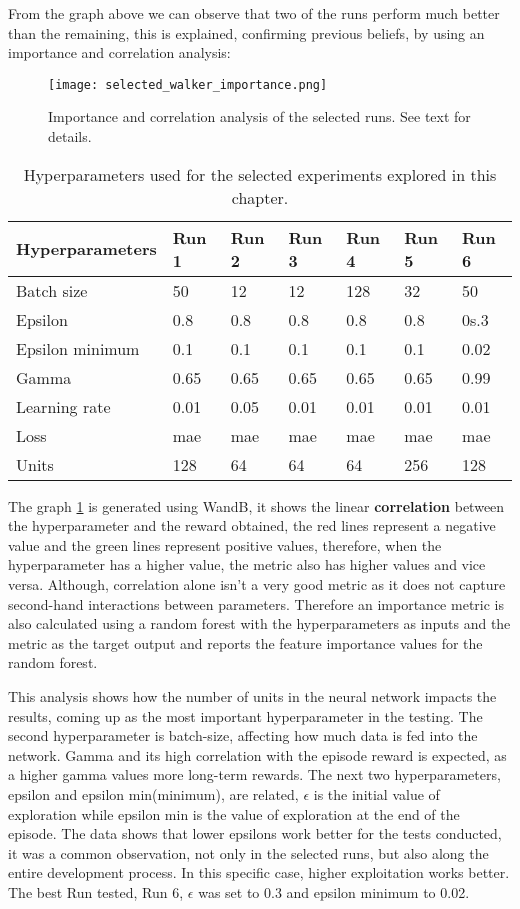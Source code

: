 From the graph above we can observe that two of the runs perform much better than the remaining, this is explained, confirming previous beliefs, by using an importance and correlation analysis:
\begin{figure}[H]
 \centering
 \texttt{[image: selected\_walker\_importance.png]}
 \caption{Importance and correlation analysis of the selected runs. See text for details.}
\label{fig:importance}
\end{figure}

\begin{table}[H]
 \centering
 \caption{Hyperparameters used for the selected experiments explored in this chapter.}
 \label{table:graph_walker}
 \begin{tabular}{|l|l|l|l|l|l|l|}
 \hline
 Hyperparameters & Run 1 & Run 2 & Run 3 & Run 4 & Run 5 & Run 6 \\ \hline
 Batch size & 50 & 12 & 12 & 128 & 32 & 50 \\ \hline
 Epsilon & 0.8 & 0.8 & 0.8 & 0.8 & 0.8 & 0s.3 \\ \hline
 Epsilon minimum & 0.1 & 0.1 & 0.1 & 0.1 & 0.1 & 0.02 \\ \hline
 Gamma & 0.65 & 0.65 & 0.65 & 0.65 & 0.65 & 0.99 \\ \hline
 Learning rate & 0.01 & 0.05 & 0.01 & 0.01 & 0.01 & 0.01 \\ \hline
 Loss & mae & mae & mae & mae & mae & mae \\ \hline
 Units & 128 & 64 & 64 & 64 & 256 & 128 \\ \hline
 \end{tabular}
 \end{table}

The graph \ref{fig:importance} is generated using WandB, it shows the linear \textbf{correlation} between the hyperparameter and the reward obtained, the red lines represent a negative value and the green lines represent positive values, therefore, when the hyperparameter has a higher value, the metric also has higher values and vice versa. Although, correlation alone isn't a very good metric as it does not capture second-hand interactions between parameters.\cite{parameterimportance}
Therefore an importance metric is also calculated using a random forest with the hyperparameters as inputs and the metric as the target output and reports the feature importance values for the random forest.

This analysis shows how the number of units in the neural network impacts the results, coming up as the most important hyperparameter in the testing. The second hyperparameter is batch-size, affecting how much data is fed into the network. Gamma and its high correlation with the episode reward is expected, as a higher gamma values more long-term rewards. The next two hyperparameters, epsilon and epsilon min(minimum), are related, $\epsilon$ is the initial value of exploration while epsilon min is the value of exploration at the end of the episode. The data shows that lower epsilons work better for the tests conducted, it was a common observation, not only in the selected runs, but also along the entire development process. 
In this specific case, higher exploitation works better. The best Run tested, Run 6, $\epsilon$ was set to 0.3 and epsilon minimum to 0.02.
